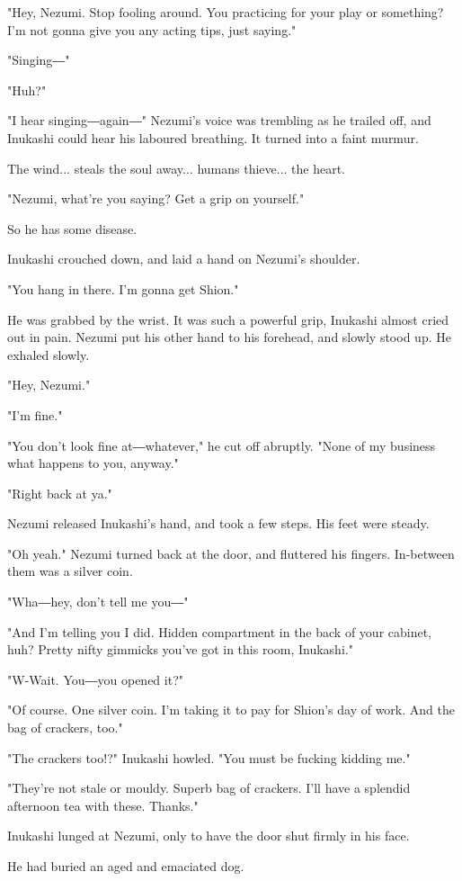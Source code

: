 "Hey, Nezumi. Stop fooling around. You practicing for your play or
something? I'm not gonna give you any acting tips, just saying."

"Singing―"

"Huh?"

"I hear singing―again―" Nezumi's voice was trembling as he trailed off,
and Inukashi could hear his laboured breathing. It turned into a faint
murmur.

The wind... steals the soul away... humans thieve... the heart.

"Nezumi, what're you saying? Get a grip on yourself."

So he has some disease.

Inukashi crouched down, and laid a hand on Nezumi's shoulder.

"You hang in there. I'm gonna get Shion."

He was grabbed by the wrist. It was such a powerful grip, Inukashi
almost cried out in pain. Nezumi put his other hand to his forehead, and
slowly stood up. He exhaled slowly.

"Hey, Nezumi."

"I'm fine."

"You don't look fine at―whatever," he cut off abruptly. "None of my
business what happens to you, anyway."

"Right back at ya."

Nezumi released Inukashi's hand, and took a few steps. His feet were
steady.

"Oh yeah." Nezumi turned back at the door, and fluttered his fingers.
In-between them was a silver coin.

"Wha―hey, don't tell me you―"

"And I'm telling you I did. Hidden compartment in the back of your
cabinet, huh? Pretty nifty gimmicks you've got in this room, Inukashi."

"W-Wait. You―you opened it?"

"Of course. One silver coin. I'm taking it to pay for Shion's day of
work. And the bag of crackers, too."

"The crackers too!?" Inukashi howled. "You must be fucking kidding me."

"They're not stale or mouldy. Superb bag of crackers. I'll have a
splendid afternoon tea with these. Thanks."

Inukashi lunged at Nezumi, only to have the door shut firmly in his
face.

He had buried an aged and emaciated dog.

